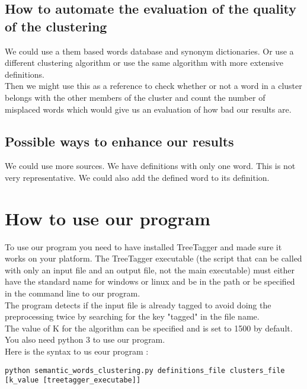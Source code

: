 \documentclass{eplDoc}
\begin{document}
\subsection{How to automate the evaluation of the quality of the clustering} %
We could use a them based words database and synonym dictionaries. Or use a different clustering algorithm or use the same algorithm with more extensive definitions. \\ 
Then we might use this as a reference to check whether or not a word in a cluster belongs with the other members of the cluster and count the number of misplaced words which would give us an evaluation of how bad our results are. 


\subsection{Possible ways to enhance our results} %
We could use more sources.  We have definitions with only one word.  This is not very representative.  We could also add the defined word to its definition.

\section{How to use our program}
To use our program you need to have installed TreeTagger and made sure it works on your platform. The TreeTagger executable (the script that can be called with only an input file and an output file, not the main executable) must either have the standard name for windows or linux and be in the path or be specified in the command line to our program. \\ 
The program detects if the input file is already tagged to avoid doing the preprocessing twice by searching for the key "tagged" in the file name. \\ 
The value of K for the algorithm can be specified and is set to 1500 by default. \\
You also need python 3 to use our program. \\ 
Here is the syntax to us eour program : 
\lstset{breaklines=true}
\begin{lstlisting}
python semantic_words_clustering.py definitions_file clusters_file [k_value [treetagger_executabe]]
\end{lstlisting}
\end{document}
